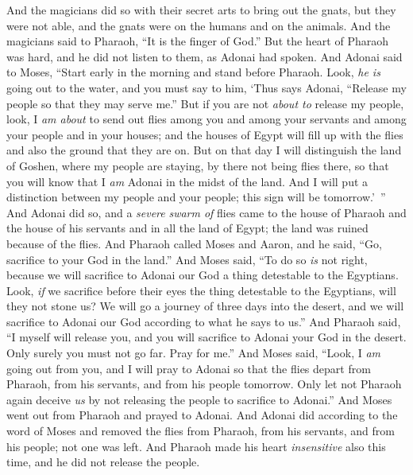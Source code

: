\begin{biblechapter}
\verse And the magicians did so with their secret arts to bring out the gnats, but they were not able, and the gnats were on the humans and on the animals.
\verse And the magicians said to Pharaoh, “It is the finger of God.” But the heart of Pharaoh was hard, and he did not listen to them, as Adonai had spoken.
 And Adonai said to Moses, “Start early in the morning and stand before Pharaoh. Look, \textit{he is} going out to the water, and you must say to him, ‘Thus says Adonai, “Release my people so that they may serve me.”
\verse But if you are not \textit{about to} release my people, look, I \textit{am about} to send out flies among you and among your servants and among your people and in your houses; and the houses of Egypt will fill up with the flies and also the ground that they are on.
\verse But on that day I will distinguish the land of Goshen, where my people are staying, by there not being flies there, so that you will know that I \textit{am} Adonai in the midst of the land.
\verse And I will put a distinction between my people and your people; this sign will be tomorrow.’ ”
\verse And Adonai did so, and a \textit{severe} \textit{swarm of} flies came to the house of Pharaoh and the house of his servants and in all the land of Egypt; the land was ruined because of the flies.
\verse And Pharaoh called Moses and Aaron, and he said, “Go, sacrifice to your God in the land.”
\verse And Moses said, “To do so \textit{is} not right, because we will sacrifice to Adonai our God a thing detestable to the Egyptians. Look, \textit{if} we sacrifice before their eyes the thing detestable to the Egyptians, will they not stone us?
\verse We will go a journey of three days into the desert, and we will sacrifice to Adonai our God according to what he says to us.”
\verse And Pharaoh said, “I myself will release you, and you will sacrifice to Adonai your God in the desert. Only surely you must not go far. Pray for me.”
\verse And Moses said, “Look, I \textit{am} going out from you, and I will pray to Adonai so that the flies depart from Pharaoh, from his servants, and from his people tomorrow. Only let not Pharaoh again deceive \textit{us} by not releasing the people to sacrifice to Adonai.”
\verse And Moses went out from Pharaoh and prayed to Adonai.
\verse And Adonai did according to the word of Moses and removed the flies from Pharaoh, from his servants, and from his people; not one was left.
\verse And Pharaoh made his heart \textit{insensitive} also this time, and he did not release the people.
\end{biblechapter}


